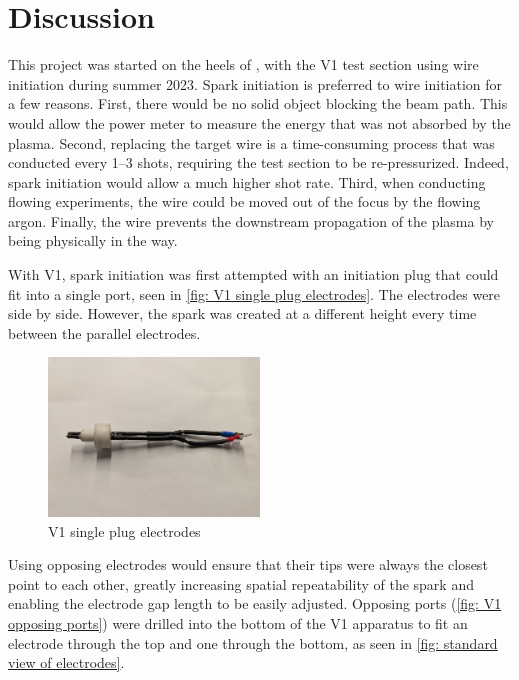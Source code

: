 \chapter{Discussion}

This project was started on the heels of \textcite{duplayArgonLaserPlasmaThruster2024a}, with the V1 test section using wire initiation during summer 2023. Spark initiation is preferred to wire initiation for a few reasons. First, there would be no solid object blocking the beam path. This would allow the power meter to measure the energy that was not absorbed by the plasma. Second, replacing the target wire is a time-consuming process that was conducted every 1–3 shots, requiring the test section to be re-pressurized. Indeed, spark initiation would allow a much higher shot rate. Third, when conducting flowing experiments, the wire could be moved out of the focus by the flowing argon. Finally, the wire prevents the downstream propagation of the plasma by being physically in the way.

With V1, spark initiation was first attempted with an initiation plug that could fit into a single port, seen in \autoref{fig: V1 single plug electrodes}. The electrodes were side by side. However, the spark was created at a different height every time between the parallel electrodes.

\begin{figure}[!ht]
    \centering
    \includegraphics[width=0.5\textwidth]{assets/5 discussion/V1 single plug electrode.jpg}
    \caption{V1 single plug electrodes}
    \label{fig: V1 single plug electrodes}
\end{figure}

Using opposing electrodes would ensure that their tips were always the closest point to each other, greatly increasing spatial repeatability of the spark and enabling the electrode gap length to be easily adjusted. Opposing ports (\autoref{fig: V1 opposing ports}) were drilled into the bottom of the V1 apparatus to fit an electrode through the top and one through the bottom, as seen in \autoref{fig: standard view of electrodes}.

